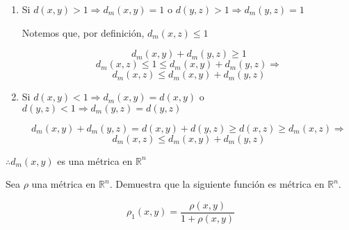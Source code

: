 \begin{proofexplanation}
\begin{enumerate}[label=(\subscript{D}{{\arabic*}})]
\begin{enumerate}
    \item  Si ${d}(x,y) > 1 \Rightarrow {d}_{m}(x,y)=1 $ o ${d}(y,z) > 1 \Rightarrow {d}_{m}(y,z)=1 $

Notemos que, por definición, ${d}_{m}(x,z) \leqslant 1$

\begin{equation*}
    {d}_{m}(x,y) +{d}_{m}(y,z) \geqslant 1
\end{equation*}
\begin{equation*}
    {d}_{m}(x,z) \leqslant 1 \leqslant {d}_{m}(x,y) +{d}_{m}(y,z) \Rightarrow
\end{equation*}
\begin{equation*}
    {d}_{m}(x,z) \leqslant {d}_{m}(x,y) +{d}_{m}(y,z)
\end{equation*}


\item Si ${d}(x,y) < 1 \Rightarrow {d}_{m}(x,y)={d}(x,y) $ o ${d}(y,z) < 1 \Rightarrow {d}_{m}(y,z)={d}(y,z) $

\begin{equation*}
    {d}_{m}(x,y)+{d}_{m}(y,z)= {d}(x,y)+{d}(y,z) \geqslant {d}(x,z) \geqslant {d}_{m}(x,z) \Rightarrow
\end{equation*}
\begin{equation*}
    {d}_{m}(x,z) \leqslant {d}_{m}(x,y) +{d}_{m}(y,z)
\end{equation*}

\end{enumerate}
\end{enumerate}

$\therefore {d}_{m}(x,y)$ es una métrica en $\mathbb{R}^{n}$
\end{proofexplanation}


\begin{eg}
    

Sea $\rho$ una métrica en $\mathbb{R}^{n}$. Demuestra que la siguiente función es métrica en $\mathbb{R}^{n}$.

\begin{equation*}
    {\rho}_{1}(x,y)=\frac{\rho(x,y)}{1+\rho(x,y)}
\end{equation*}

\end{eg}

